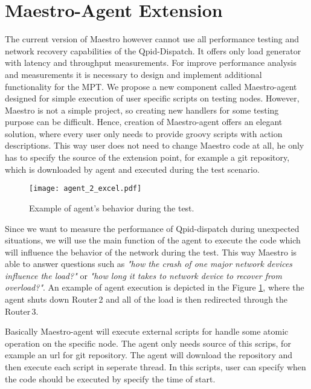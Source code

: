 \documentclass{ExcelAtFIT}
\begin{document}
\section{Maestro-Agent Extension}
\label{sec:maestro_agent}
The current version of Maestro however cannot use all performance testing and network recovery capabilities of the Qpid-Dispatch. It offers only load generator with latency and throughput measurements. For improve performance analysis and measurements it is necessary to design and implement additional functionality for the MPT. We propose a new component called Maestro-agent designed for simple execution of user specific scripts on testing nodes. However, Maestro is not a simple project, so creating new handlers for some testing purpose can be difficult. Hence, creation of Maestro-agent offers an elegant solution, where every user only needs to provide groovy scripts with action descriptions. This way user does not need to change Maestro code at all, he only has to specify the source of the extension point, for example a git repository, which is downloaded by agent and executed during the test scenario.


\begin{figure}[h]
	\centering
	\texttt{[image: agent\_2\_excel.pdf]}
	\caption{Example of agent's behavior during the test.}
	\label{fig:agent_2}
\end{figure}

Since we want to measure the performance of Qpid-dispatch during unexpected situations, we will use the main function of the agent to execute the code which will influence the behavior of the network during the test. This way Maestro is able to answer questions such as \emph{"how the crash of one major network devices influence the load?"} or \emph{"how long it takes to network device to recover from overload?"}. An example of agent execution is depicted in the Figure \ref{fig:agent_2}, where the agent shuts down Router\,2 and all of the load is then redirected through the Router\,3.

Basically Maestro-agent will execute external scripts for handle some atomic operation on the specific node. The agent only needs source of this scrips, for example an url for git repository. The agent will download the repository and then execute each script in seperate thread. In this scripts, user can specify when the code should be executed by specify the time of start.
\end{document}
